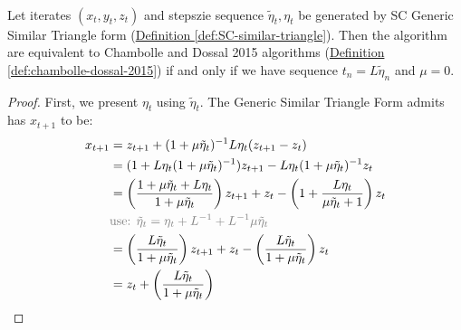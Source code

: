 \documentclass[12pt]{article}
\begin{document}
        \begin{proposition}
            \label{prop:cham-dossal-2015-is-similar-triangle}
            \;\\
            Let iterates $(x_t, y_t, z_t)$ and stepszie sequence $\tilde \eta_t, \eta_t$ be generated by SC Generic Similar Triangle form
            (\hyperref[def:SC-similar-triangle]
            {Definition \ref*{def:SC-similar-triangle}}). 
            Then the algorithm are equivalent to Chambolle and Dossal 2015 algorithms 
            (\hyperref[def:chambolle-dossal-2015]
            {Definition \ref*{def:chambolle-dossal-2015}})
            if and only if we have sequence $t_n = L \tilde \eta_{n}$ and $\mu = 0$. 
        \end{proposition}
        \begin{proof}
            First, we present $\eta_t$ using $\tilde \eta_t$. 
            The Generic Similar Triangle Form admits has $x_{t + 1}$ to be: 
            \begin{align*}
                x_{t + 1} 
                &= z_{t + 1} + (1 + \mu\tilde \eta_{t})^{-1}L\eta_t (z_{t + 1} - z_t)
                \\
                &=  
                (1 + L\eta_t(1 + \mu \tilde \eta_{t})^{-1})z_{t + 1}
                - L\eta_t(1 + \mu\tilde \eta_{t})^{-1} z_t
                \\
                &= 
                \left(
                    \frac{1 + \mu\tilde \eta_{t} + L \eta_t}{1 + \mu \tilde \eta_{t}}
                \right)z_{t + 1}
                + 
                z_t - 
                \left(
                    1 + \frac{ L\eta_t}{\mu \tilde \eta_t + 1}
                \right)z_t
                \\
                & 
                \textcolor{gray}{
                    \text{use: } \tilde \eta_t = \eta_t + L^{-1} + L^{-1}\mu\tilde \eta_t
                }
                \\
                &= 
                \left(
                    \frac{L\tilde \eta_{t}}{1 + \mu\tilde \eta_{t}}
                \right)z_{t + 1}
                + 
                z_t 
                - 
                \left(
                    \frac{L\tilde \eta_{t}}{1 + \mu \tilde \eta_{t}}
                \right)z_t 
                \\
                &= z_t + 
                \left(
                    \frac{L\tilde \eta_{t}}{1 + \mu \tilde \eta_{t}}
                \right)

\end{align*}
\end{proof}
\end{document}
